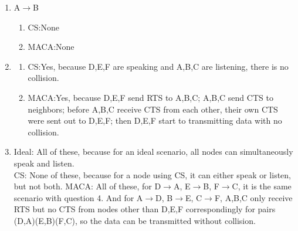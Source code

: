 \documentclass[11pt]{article}
\begin{document}
\begin{enumerate}
\begin{enumerate}
\begin{enumerate}
\end{enumerate}
\end{enumerate}
\item A$\rightarrow$B
\begin{enumerate}
\item CS:None
\item MACA:None
\end{enumerate}
\item
\begin{enumerate}
\item CS:Yes, because D,E,F are speaking and A,B,C are listening, there is no collision.
\item MACA:Yes, because D,E,F send RTS to A,B,C; A,B,C send CTS to neighbors; before A,B,C receive CTS from each other, their own CTS were sent out to D,E,F; then D,E,F start to transmitting data with no collision.
\end{enumerate}
\item
Ideal: All of these, because for an ideal scenario, all nodes can simultaneously speak and listen.\\
CS: None of these, because for a node using CS, it can either speak or listen, but not both.
MACA: All of these, for D$\rightarrow$A, E$\rightarrow$B, F$\rightarrow$C, it is the same scenario with question 4. And for A$\rightarrow$D, B$\rightarrow$E, C$\rightarrow$F, A,B,C only receive RTS but no CTS from nodes other than D,E,F correspondingly for pairs (D,A)(E,B)(F,C), so the data can be transmitted without collision.
\end{enumerate}
\label{pg:end-of-p3}

%
\newpage
\end{document}
